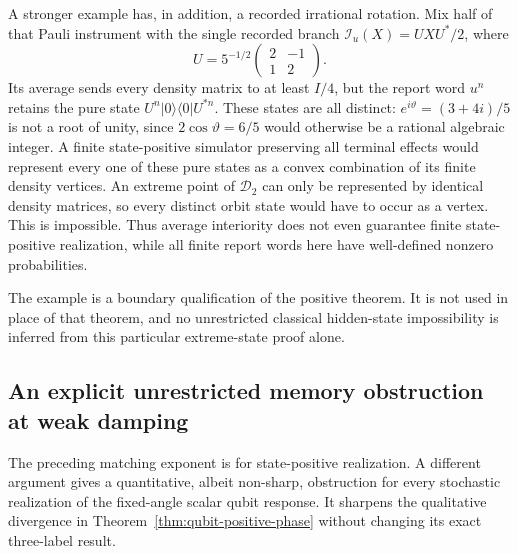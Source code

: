 A stronger example has, in addition, a recorded irrational rotation. Mix half of that Pauli instrument with the single recorded branch $\mathcal I_u(X)=UXU^*/2$, where
\[
 U=5^{-1/2}\begin{pmatrix}2&-1\\1&2\end{pmatrix}.
\]
Its average sends every density matrix to at least $I/4$, but the report word $u^n$ retains the pure state $U^n|0\rangle\langle0|U^{*n}$. These states are all distinct: $e^{i\vartheta}=(3+4i)/5$ is not a root of unity, since $2\cos\vartheta=6/5$ would otherwise be a rational algebraic integer. A finite state-positive simulator preserving all terminal effects would represent every one of these pure states as a convex combination of its finite density vertices. An extreme point of $\mathcal D_2$ can only be represented by identical density matrices, so every distinct orbit state would have to occur as a vertex. This is impossible. Thus average interiority does not even guarantee finite state-positive realization, while all finite report words here have well-defined nonzero probabilities.

The example is a boundary qualification of the positive theorem. It is not used in place of that theorem, and no unrestricted classical hidden-state impossibility is inferred from this particular extreme-state proof alone.

\subsection{An explicit unrestricted memory obstruction at weak damping}
The preceding matching exponent is for state-positive realization. A different argument gives a quantitative, albeit non-sharp, obstruction for every stochastic realization of the fixed-angle scalar qubit response. It sharpens the qualitative divergence in Theorem~\ref{thm:qubit-positive-phase} without changing its exact three-label result.

